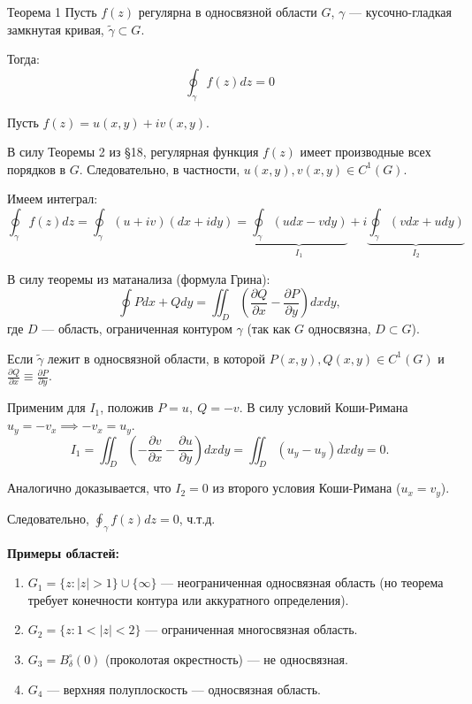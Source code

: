 \begin{theorem}{Теорема 1}
    Пусть $f(z)$ регулярна в односвязной области $G$, $\gamma$ — кусочно-гладкая замкнутая кривая, $\tilde{\gamma} \subset G$.
    
    Тогда:
    \begin{equation} \label{eq:19.1}
        \oint_{\gamma} f(z) dz = 0
    \end{equation}
\end{theorem}

\begin{tproof}
    Пусть $f(z) = u(x,y) + i v(x,y)$.
    
    В силу Теоремы 2 из §18, регулярная функция $f(z)$ имеет производные всех порядков в $G$. Следовательно, в частности, $u(x,y), v(x,y) \in C^1(G)$.
    
    Имеем интеграл:
    \[
        \oint_{\gamma} f(z) dz = \oint_{\gamma} (u + iv)(dx + i dy) = \underbrace{\oint_{\gamma} (u dx - v dy)}_{I_1} + i \underbrace{\oint_{\gamma} (v dx + u dy)}_{I_2}
    \]
    
    В силу теоремы из матанализа (формула Грина):
    \[
        \oint P dx + Q dy = \iint_{D} \left( \frac{\partial Q}{\partial x} - \frac{\partial P}{\partial y} \right) dx dy,
    \]
    где $D$ — область, ограниченная контуром $\gamma$ (так как $G$ односвязна, $D \subset G$).
    
    Если $\tilde{\gamma}$ лежит в односвязной области, в которой $P(x,y), Q(x,y) \in C^1(G)$ и $\frac{\partial Q}{\partial x} \equiv \frac{\partial P}{\partial y}$.
    
    Применим для $I_1$, положив $P = u, ~ Q = -v$.
    В силу условий Коши-Римана $u_y = -v_x \implies -v_x = u_y$.
    \[
        I_1 = \iint_{D} \left( -\frac{\partial v}{\partial x} - \frac{\partial u}{\partial y} \right) dx dy = \iint_{D} (u_y - u_y) dx dy = 0.
    \]
    
    Аналогично доказывается, что $I_2 = 0$ из второго условия Коши-Римана ($u_x = v_y$).
    
    Следовательно, $\oint_{\gamma} f(z) dz = 0$, ч.т.д.
\end{tproof}

\textbf{Примеры областей:}
\begin{enumerate}
    \item $G_1 = \{z : |z| > 1\} \cup \{\infty\}$ — неограниченная односвязная область (но теорема требует конечности контура или аккуратного определения).
    \item $G_2 = \{z : 1 < |z| < 2\}$ — ограниченная многосвязная область.
    \item $G_3 = B_{\delta}^{\circ}(0)$ (проколотая окрестность) — не односвязная.
    \item $G_4$ — верхняя полуплоскость — односвязная область.
\end{enumerate}

